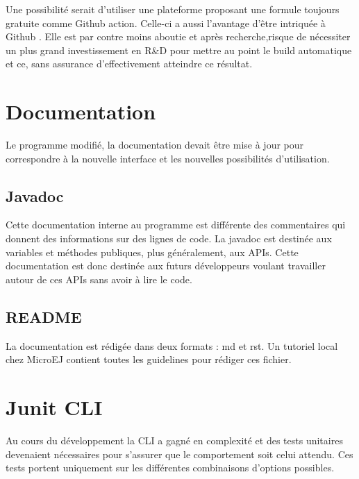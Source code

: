 \documentclass[french,a4paper,12pt]{report}
\begin{document}
Une possibilité serait d’utiliser une plateforme proposant une formule toujours gratuite comme Github action. Celle-ci a aussi l’avantage d’être intriquée à Github . Elle est par contre moins aboutie et après recherche,risque de nécessiter un plus grand investissement en R\&D pour mettre au  point le build automatique et ce, sans assurance d’effectivement atteindre ce résultat.

\section{Documentation}

Le programme modifié, la documentation devait être mise à jour pour correspondre à la nouvelle interface et les nouvelles possibilités d’utilisation.

\subsection{Javadoc}
Cette documentation interne au programme est différente des commentaires qui donnent des informations sur des lignes de code. La javadoc est destinée aux variables et méthodes publiques, plus généralement, aux APIs. Cette documentation est donc destinée aux futurs développeurs voulant travailler autour de ces APIs sans avoir à lire le code.

\subsection{README}

La documentation est rédigée dans deux formats : md et rst. Un tutoriel local chez MicroEJ contient toutes les guidelines pour rédiger ces fichier.

\section{Junit CLI}

Au cours du développement la CLI a gagné en complexité et des tests unitaires devenaient nécessaires pour s’assurer que le comportement soit celui attendu. Ces tests portent uniquement sur les différentes combinaisons d’options possibles. 
\end{document}
